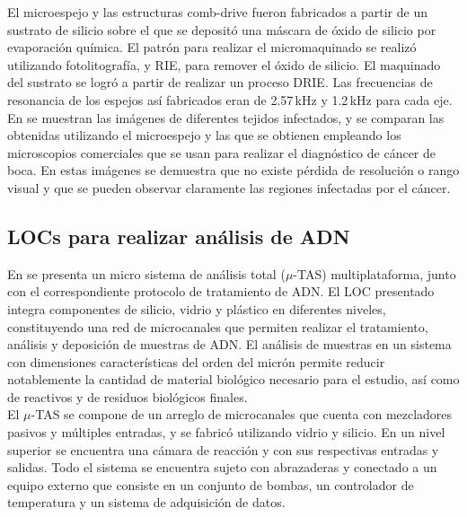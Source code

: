 \documentclass[a4paper, 12pt]{article}
\begin{document}
El microespejo y las estructuras comb-drive fueron fabricados a partir de un sustrato de silicio sobre el que se depositó una máscara de óxido de silicio por evaporación química. El patrón para realizar el micromaquinado se realizó utilizando fotolitografía, y RIE, para remover el óxido de silicio. El maquinado del sustrato se logró a partir de realizar un proceso DRIE. Las frecuencias de resonancia de los espejos así fabricados eran de 2.57\,kHz y 1.2\,kHz para cada eje.\\

En \cite{Wang2012} se muestran las imágenes de diferentes tejidos infectados, y se comparan las obtenidas utilizando el microespejo y las que se obtienen empleando los microscopios comerciales que se usan para realizar el diagnóstico de cáncer de boca. En estas imágenes se demuestra que no existe pérdida de resolución o rango visual y que se pueden observar claramente las regiones infectadas por el cáncer.

\subsection{LOCs para realizar análisis de ADN}\label{SS:dna}
En \cite{Marasso2011} se presenta un micro sistema de análisis total ($\mu$-TAS) multiplataforma, junto con el correspondiente protocolo de tratamiento de ADN. El LOC presentado integra componentes de silicio, vidrio y plástico en diferentes niveles, constituyendo una red de microcanales que permiten realizar el tratamiento, análisis y deposición de muestras de ADN. El análisis de muestras en un sistema con dimensiones características del orden del micrón permite reducir notablemente la cantidad de material biológico necesario para el estudio, así como de reactivos y de residuos biológicos finales.\\

El $\mu$-TAS se compone de un arreglo de microcanales que cuenta con mezcladores pasivos y múltiples entradas, y se fabricó utilizando vidrio y silicio. En un nivel superior se encuentra una cámara de reacción y con sus respectivas entradas y salidas. Todo el sistema se encuentra sujeto con abrazaderas y conectado a un equipo externo que consiste en un conjunto de bombas, un controlador de temperatura y un sistema de adquisición de datos.\\
\end{document}
